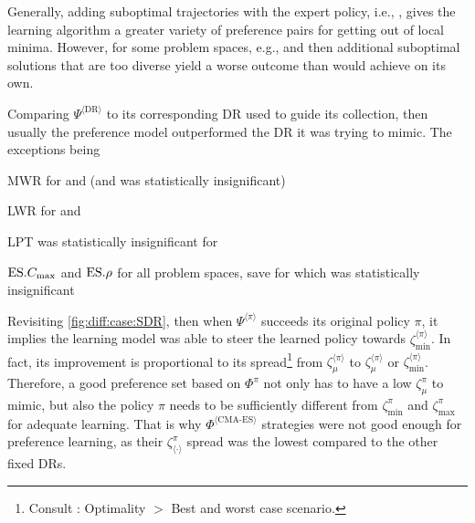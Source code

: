 Generally, adding suboptimal trajectories with the expert policy, i.e., 
, gives the learning algorithm a greater variety of preference 
pairs for getting out of local minima. However, for some problem spaces, e.g., 
 and  then additional suboptimal solutions that are too 
diverse yield a worse outcome than  would achieve on its own.


\pagebreak
Comparing $\Psi^{\langle\text{DR}\rangle}$ to its corresponding DR used to 
guide its collection, then usually the preference model outperformed the DR it 
was trying to mimic. The exceptions being 
\begin{enumerate*}
  \item MWR for  and  (and  was 
  statistically insignificant)
  \item LWR for  and 
  \item LPT was statistically insignificant for 
  \item $\text{ES}.{C_{\max}}$ and $\text{ES}.{\rho}$ for all problem spaces, save for  
  which was statistically insignificant
\end{enumerate*}
Revisiting \cref{fig:diff:case:SDR}, then when $\Psi^{\langle\pi\rangle}$ 
succeeds its original policy $\pi$, it implies the learning model was able to 
steer the learned policy towards $\zeta_{\min}^{\langle\pi\rangle}$. 
In fact, its improvement is proportional to its spread\footnote{Consult \shiny:
    Optimality $>$ Best and worst case scenario.}  
from $\zeta_{\mu}^{\langle\pi\rangle}$ to $\zeta_{\mu}^{\langle\pi\rangle}$ or 
$\zeta_{\min}^{\langle\pi\rangle}$.
Therefore, a good preference set based on $\Phi^\pi$ not only has to have a low 
$\zeta_{\mu}^\pi$ to mimic, but also the policy $\pi$ needs to be sufficiently 
different from $\zeta_{\min}^{\pi}$ and $\zeta_{\max}^{\pi}$ for adequate 
learning. That is why $\Phi^{\langle \text{CMA-ES} \rangle}$ strategies 
were not good enough for preference learning, as their 
$\zeta^\pi_{\langle\cdot\rangle}$ spread was the lowest compared to the other 
fixed DRs.

